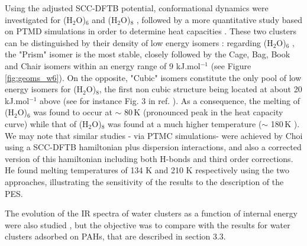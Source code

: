 \documentclass[]{interact}
\newcommand{\red}[1]{{\color{red}#1}}
\theoremstyle{plain}%
\theoremstyle{definition}
\theoremstyle{remark}
\begin{document}
		Using the adjusted SCC-DFTB potential, conformational dynamics were investigated for (H$_2$O)$_6$ \cite{SimonJCP2013}  and (H$_2$O)$_8$ \cite{SimonCOMP2013}, followed by a more quantitative study based on PTMD simulations in order to determine heat capacities \cite{Oliveira2015}. These two clusters can be distinguished by their density of low energy isomers :  regarding (H$_2$O)$_6$ , the "Prism" isomer is the most stable, closely followed by the Cage,  Bag,  Book and Chair isomers within an energy range of 9 kJ.mol$^{-1}$ (see Figure \ref{fig:geoms_w6}). On the opposite, "Cubic" isomers constitute the only pool of low energy isomers  for (H$_2$O)$_8$, the first non cubic structure being located at about 20 kJ.mol$^{-1}$ above  (see for instance Fig. 3 in ref. \cite{SimonCOMP2013}).  As a consequence, the melting of (H$_2$O)$_6$ was found to occur at $\sim$ 80\,K (pronounced peak in the heat capacity curve) while that of (H$_2$O)$_8$ was  found at a much higher temperature ($\sim$ 180\,K \cite{Oliveira2015}).  We may note that similar studies - via PTMC simulations-  were achieved by Choi \cite{Choi2012} using a SCC-DFTB hamiltonian plus dispersion interactions, and also a corrected version of this hamiltonian including both H-bonds and third order corrections. He found  melting temperatures of 134 K and 210 K respectively using the two approaches, illustrating the sensitivity of the results to the description of the PES.    %

		
		
		The evolution of the IR spectra of water clusters as a function of internal energy were also studied  \cite{SimonPCCP2012, SimonJCP2013, SimonCOMP2013}, but the objective was to compare with the results for water clusters adsorbed on PAHs, that are described in section 3.3. %
	
\end{document}
